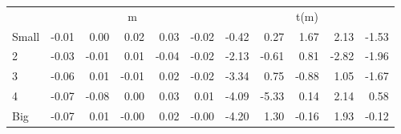 \begin{table}[!ht]
\begin{tabular}{lrrrrrrrrrr}
  
     & \multicolumn{5}{c}{m} & \multicolumn{5}{c}{t(m)}   \\
     \cmidrule(r){2-6} \cmidrule(r){7-11} 
    Small  & -0.01  & 0.00  & 0.02  & 0.03  & -0.02  & -0.42  & 0.27  & 1.67  & 2.13  & -1.53   \\
    2  & -0.03  & -0.01  & 0.01  & -0.04  & -0.02  & -2.13  & -0.61  & 0.81  & -2.82  & -1.96   \\
    3  & -0.06  & 0.01  & -0.01  & 0.02  & -0.02  & -3.34  & 0.75  & -0.88  & 1.05  & -1.67   \\
    4  & -0.07  & -0.08  & 0.00  & 0.03  & 0.01  & -4.09  & -5.33  & 0.14  & 2.14  & 0.58   \\
    Big  & -0.07  & 0.01  & -0.00  & 0.02  & -0.00  & -4.20  & 1.30  & -0.16  & 1.93  & -0.12   \\
    
  
  \bottomrule
\end{tabular}
\label{tbl:25_Size_Inv_F17}
\end{table}